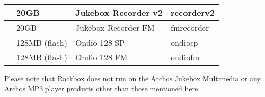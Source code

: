 \begin{minipage}{16.589cm}
\begin{center}
\begin{tabular}{|p{1.846cm}|p{5.6280003cm}|p{6.053cm}|p{2.195cm}|}
&
{\centering
20GB
\par}
&
{\centering
Jukebox Recorder v2
\par}
&
{\centering
recorderv2 
\par}
\\\hline
  [Warning: Image ignored] %
 
&
{\centering
20GB
\par}
&
{\centering
Jukebox Recorder FM
\par}
&
{\centering
fmrecorder 
\par}
\\\hline
  [Warning: Image ignored] %
 
&
{\centering
128MB\newline
(flash)
\par}
&
{\centering
Ondio 128 SP
\par}
&
{\centering
ondiosp
\par}
\\\hline
  [Warning: Image ignored] %
 
&
{\centering
128MB\newline
(flash)
\par}
&
{\centering
Ondio 128 FM
\par}
&
{\centering
ondiofm
\par}
\\\hline
\end{tabular}\end{center}
\end{minipage}Please note that Rockbox does not run on the Archos
Jukebox Multimedia or any Archos MP3 player products other than those
mentioned here.

